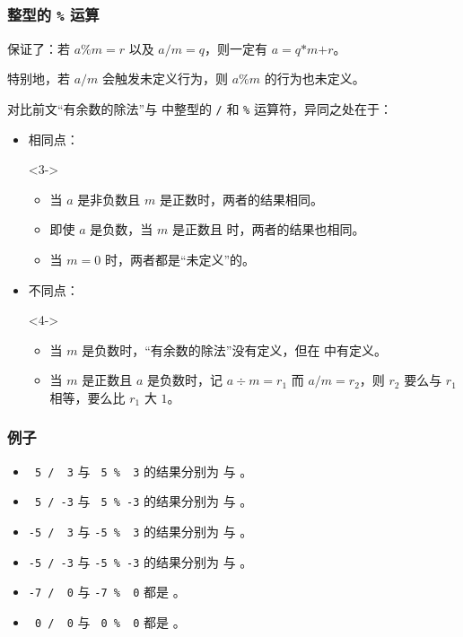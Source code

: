 \begin{frame}
  \frametitle{整型的 \texttt{\%} 运算}
  \Cpp{} 保证了：若 $a \mathbin{\texttt{\%}} m = r$ 以及 $a \mathbin{\texttt{/}} m = q$，则一定有 $a = q \mathbin{\texttt{*}} m \mathbin{\texttt{+}} r$。
  
  特别地，若 $a \mathbin{\texttt{/}} m$ 会触发未定义行为，则 $a \mathbin{\texttt{\%}} m$ 的行为也未定义。
  \pause
  
  \emptyline
  对比前文“有余数的除法”与 \Cpp{} 中整型的 \texttt{/} 和 \texttt{\%} 运算符，异同之处在于：
  \begin{itemize}
    \item 相同点：
    \begin{visibleenv}<3->
      \begin{itemize}
        \item 当 $a$ 是非负数且 $m$ 是正数时，两者的结果相同。
        \item 即使 $a$ 是负数，当 $m$ 是正数且 时，两者的结果也相同。
        \item 当 $m = 0$ 时，两者都是“未定义”的。
      \end{itemize}
    \end{visibleenv}
    \item 不同点：
    \begin{visibleenv}<4->
      \begin{itemize}
        \item 当 $m$ 是负数时，“有余数的除法”没有定义，但在 \Cpp{} 中有定义。
        \item 当 $m$ 是正数且 $a$ 是负数时，记 $a \div m = r_1$ 而 $a \mathbin{\texttt{/}} m = r_2$，则 $r_2$ 要么与 $r_1$ 相等，要么比 $r_1$ 大 $1$。
      \end{itemize}
    \end{visibleenv}
  \end{itemize}
\end{frame}
\begin{frame}
  \frametitle{例子}
  \begin{itemize}
    \item \texttt{ 5 / \ 3} 与 \texttt{ 5 \% \ 3} 的结果分别为  与 。
    \pause
    \pause
    \item \texttt{ 5 / -3} 与 \texttt{ 5 \% -3} 的结果分别为  与 。
    \pause
    \item \texttt{-5 / \ 3} 与 \texttt{-5 \% \ 3} 的结果分别为  与 。
    \pause
    \item \texttt{-5 / -3} 与 \texttt{-5 \% -3} 的结果分别为  与 。
    \pause
    \pause
    \item \texttt{-7 / \ 0} 与 \texttt{-7 \% \ 0} 都是 。
    \pause
    \item \texttt{ 0 / \ 0} 与 \texttt{ 0 \% \ 0} 都是 。
  \end{itemize}
\end{frame}
